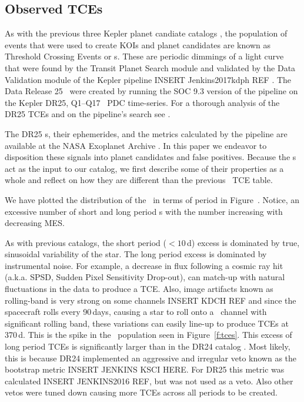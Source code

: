 \subsection{Observed TCEs}

\label{tces}
As with the previous three Kepler planet candiate catalogs \citep{Coughlin2016,Mullally2015cat,Rowe2015cat}, the population of events that were used to create KOIs and planet candidates are known as Threshold Crossing Events or \opstce s.  These are periodic dimmings of a light curve that were found by the Transit Planet Search module and validated by the Data Validation module of the Kepler pipeline INSERT Jenkins2017kdph REF \citep{Fanelli2011}.   The Data Release 25 \opstces\ were created by running the SOC 9.3 version of the pipeline on the Kepler DR25, Q1--Q17 \Kepler\ PDC time-series.  For a thorough analysis of the DR25 TCEs and on the pipeline's search see \citet{Twicken2016}.  

The DR25 \opstce s, their ephemerides, and the metrics calculated by the pipeline are available at the NASA Exoplanet Archive \citep{Akeson2013}.  In this paper we endeavor to disposition these signals into planet candidates and false positives.   Because the \opstce s act as the input to our catalog, we first describe some of their properties as a whole and reflect on how they are different than the previous \Kepler\ TCE table.

We have plotted the distribution of the \ntcesnorogue\ \opstces in terms of period in Figure~\label{f:tces}. Notice, an excessive number of short and long period \opstce s with the number increasing with decreasing MES. 

As with previous catalogs, the short period ($<10$\,d) excess is dominated by true, sinusoidal variability of the star. The long period excess is dominated by instrumental noise. For example, a decrease in flux following a cosmic ray hit (a.k.a. SPSD, Sudden Pixel Sensitivity Drop-out), can match-up with natural fluctuations in the data to produce a TCE. Also, image artifacts known as rolling-band is very strong on some channels INSERT KDCH REF\citep[see page][]{KDCH}  and since the spacecraft rolls every 90\,days, causing a star to roll onto a \Kepler\ channel with significant rolling band, these variations can easily line-up to produce TCEs at 370\,d. This is the spike in the \opstce\ population seen in Figure~\ref{f:tces}. This excess of long period TCEs is significantly larger than in the DR24 catalog \citep{Seader2015}. Most likely, this is because DR24 implemented an aggressive and irregular veto known as the bootstrap metric \citep{}INSERT JENKINS KSCI HERE.  For DR25 this metric was calculated INSERT JENKINS2016 REF, but was not used as a veto.  Also other vetos were tuned down causing more TCEs across all periods to be created.  %

